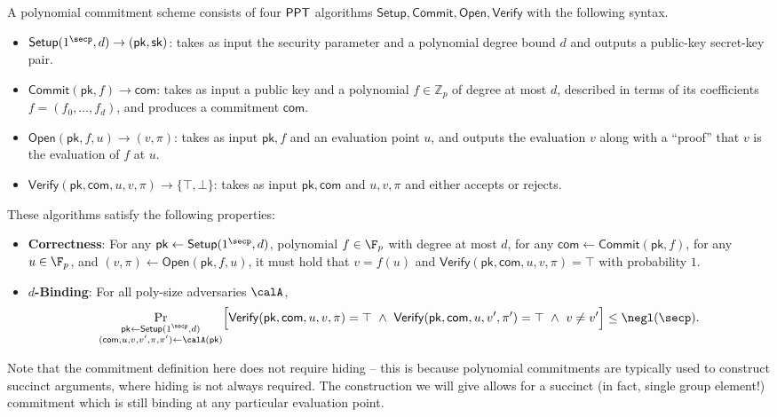 \documentclass{article}
\newcommand{\Open}{\mathsf{Open}}
\def\Commit{\mathsf{Commit}}
\def\Verify{\mathsf{Verify}}
\def\Setup{\mathsf{Setup}}
\def\pk{\mathsf{pk}}
\def\sk{\mathsf{sk}}
\def\com{\mathsf{com}}
\begin{document}
\begin{definition}
A polynomial commitment scheme consists of four ${\sf PPT}$ algorithms $\Setup, \Commit, \Open, \Verify$ with the following syntax.
\begin{itemize}
    \item $\Setup(1^\secp, d) \to (\pk, \sk)$: takes as input the security parameter and a polynomial degree bound $d$ and outputs a public-key secret-key pair.
    \item $\Commit(\pk, f) \to \com$: takes as input a public key and a polynomial $f \in \mathbb{Z}_p$ of degree at most $d$, described in terms of its coefficients $f = (f_0 ,\ldots, f_d)$, and produces a commitment $\com$.
    \item $\Open(\pk, f, u) \to (v, \pi)$: takes as input $\pk, f$ and an evaluation point $u$, and outputs the evaluation $v$ along with a ``proof'' that  $v$ is the evaluation of $f$ at $u$.
    \item $\Verify(\pk, \com, u, v, \pi) \to \{\top, \bot\}$: takes as input $\pk, \com$ and $u, v, \pi$ and either accepts or rejects.
\end{itemize}
These algorithms satisfy the following properties:
\begin{itemize}
    \item \textbf{Correctness}: For any $\pk \gets \Setup(1^\secp, d)$, polynomial $f \in \F_p$ with degree at most $d$, for any $\com \gets \Commit(\pk, f)$, for any $u \in \F_p$, and $(v, \pi) \gets \Open(\pk, f, u)$, it must hold that $v = f(u)$ and $\Verify(\pk, \com,\allowbreak u, v, \pi) = \top$ with probability $1$. 
    \item \textbf{$d$-Binding}: For all poly-size adversaries $\calA$,
    \begin{align*}
        \Pr_{\substack{\pk \gets \Setup(1^\secp, d)\\ (\com, u, v, v', \pi, \pi')\gets \calA(\pk)}} \Bigl[\Verify(\pk, \com, u, v, \pi) = \top ~\wedge~ \Verify(\pk, \com, u, v', \pi') = \top ~\wedge~ v \neq v' \Bigr] \le \negl(\secp).
    \end{align*}
\end{itemize}
\end{definition}
\begin{remark}
    Note that the commitment definition here does not require hiding -- this is because polynomial commitments are typically used to construct succinct arguments, where hiding is not always required. The construction we will give allows for a succinct (in fact, single group element!) commitment which is still binding at any particular evaluation point.
\end{remark}
\end{document}
